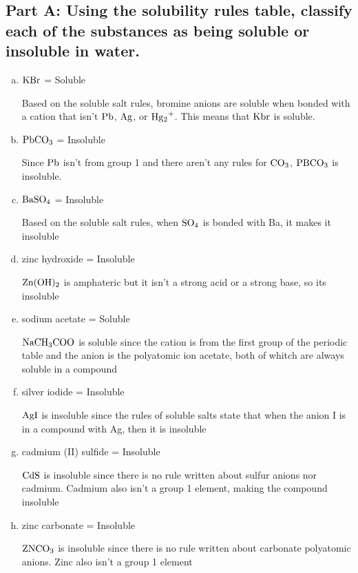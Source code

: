 \documentclass{scrartcl}
\begin{document}
\subsection{Part A: Using the solubility rules table, classify each of the substances as being soluble or insoluble in water.}
\label{sec:orgb112617}
\begin{enumerate}[a.]
\item \(\ce{KBr}\) = Soluble

Based on the soluble salt rules, bromine anions are
soluble when bonded with a cation that isn't \(\ce{Pb}\), \(\ce{Ag}\),
or \(\ce{Hg2+}\). This means that \(\ce{Kbr}\) is soluble.

\item \(\ce{PbCO3}\) = Insoluble

Since \(\ce{Pb}\) isn't from group 1 and there
aren't any rules for \(\ce{CO3}\), \(\ce{PBCO3}\) is insoluble.

\item \(\ce{BaSO4}\) = Insoluble

Based on the soluble salt rules, when
\(\ce{SO4}\) is bonded with Ba, it makes it insoluble

\item zinc hydroxide = Insoluble

\(\ce{Zn(OH)2}\) is amphateric but it isn't a
strong acid or a strong base, so its insoluble

\item sodium acetate = Soluble

\(\ce{NaCH3COO}\) is soluble since the cation is
from the first group of the periodic table and the anion is the polyatomic
ion acetate, both of whitch are always soluble in a compound

\item silver iodide = Insoluble

\(\ce{AgI}\) is insoluble since the rules of
soluble salts state that when the anion I is in a compound with Ag, then it
is insoluble

\item cadmium (II) sulfide = Insoluble

\(\ce{CdS}\) is insoluble since there is
no rule written about sulfur anions nor cadmium. Cadmium also isn't a group 1
element, making the compound insoluble

\item zinc carbonate = Insoluble

\(\ce{ZNCO3}\) is insoluble since there is no
rule written about carbonate polyatomic anions. Zinc also isn't a group 1
element


\end{enumerate}
\end{document}
